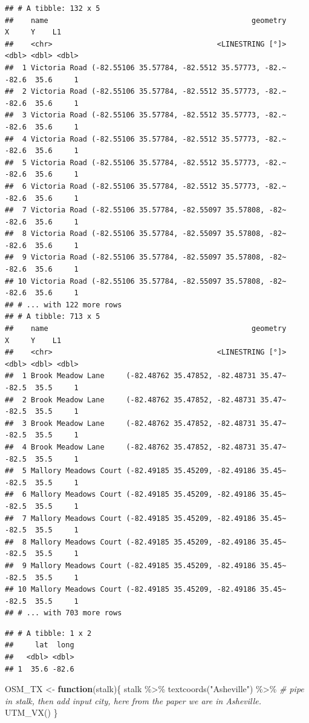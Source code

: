 \documentclass[
]{article}
\newenvironment{Shaded}{\begin{snugshade}}{\end{snugshade}}
\newcommand{\CommentTok}[1]{\textcolor[rgb]{0.56,0.35,0.01}{\textit{#1}}}
\newcommand{\ControlFlowTok}[1]{\textcolor[rgb]{0.13,0.29,0.53}{\textbf{#1}}}
\newcommand{\FunctionTok}[1]{\textcolor[rgb]{0.00,0.00,0.00}{#1}}
\newcommand{\NormalTok}[1]{#1}
\newcommand{\OtherTok}[1]{\textcolor[rgb]{0.56,0.35,0.01}{#1}}
\newcommand{\SpecialCharTok}[1]{\textcolor[rgb]{0.00,0.00,0.00}{#1}}
\newcommand{\StringTok}[1]{\textcolor[rgb]{0.31,0.60,0.02}{#1}}
\begin{document}
\begin{verbatim}
## # A tibble: 132 x 5
##    name                                               geometry     X     Y    L1
##    <chr>                                      <LINESTRING [°]> <dbl> <dbl> <dbl>
##  1 Victoria Road (-82.55106 35.57784, -82.5512 35.57773, -82.~ -82.6  35.6     1
##  2 Victoria Road (-82.55106 35.57784, -82.5512 35.57773, -82.~ -82.6  35.6     1
##  3 Victoria Road (-82.55106 35.57784, -82.5512 35.57773, -82.~ -82.6  35.6     1
##  4 Victoria Road (-82.55106 35.57784, -82.5512 35.57773, -82.~ -82.6  35.6     1
##  5 Victoria Road (-82.55106 35.57784, -82.5512 35.57773, -82.~ -82.6  35.6     1
##  6 Victoria Road (-82.55106 35.57784, -82.5512 35.57773, -82.~ -82.6  35.6     1
##  7 Victoria Road (-82.55106 35.57784, -82.55097 35.57808, -82~ -82.6  35.6     1
##  8 Victoria Road (-82.55106 35.57784, -82.55097 35.57808, -82~ -82.6  35.6     1
##  9 Victoria Road (-82.55106 35.57784, -82.55097 35.57808, -82~ -82.6  35.6     1
## 10 Victoria Road (-82.55106 35.57784, -82.55097 35.57808, -82~ -82.6  35.6     1
## # ... with 122 more rows
## # A tibble: 713 x 5
##    name                                               geometry     X     Y    L1
##    <chr>                                      <LINESTRING [°]> <dbl> <dbl> <dbl>
##  1 Brook Meadow Lane     (-82.48762 35.47852, -82.48731 35.47~ -82.5  35.5     1
##  2 Brook Meadow Lane     (-82.48762 35.47852, -82.48731 35.47~ -82.5  35.5     1
##  3 Brook Meadow Lane     (-82.48762 35.47852, -82.48731 35.47~ -82.5  35.5     1
##  4 Brook Meadow Lane     (-82.48762 35.47852, -82.48731 35.47~ -82.5  35.5     1
##  5 Mallory Meadows Court (-82.49185 35.45209, -82.49186 35.45~ -82.5  35.5     1
##  6 Mallory Meadows Court (-82.49185 35.45209, -82.49186 35.45~ -82.5  35.5     1
##  7 Mallory Meadows Court (-82.49185 35.45209, -82.49186 35.45~ -82.5  35.5     1
##  8 Mallory Meadows Court (-82.49185 35.45209, -82.49186 35.45~ -82.5  35.5     1
##  9 Mallory Meadows Court (-82.49185 35.45209, -82.49186 35.45~ -82.5  35.5     1
## 10 Mallory Meadows Court (-82.49185 35.45209, -82.49186 35.45~ -82.5  35.5     1
## # ... with 703 more rows
\end{verbatim}

\begin{verbatim}
## # A tibble: 1 x 2
##     lat  long
##   <dbl> <dbl>
## 1  35.6 -82.6
\end{verbatim}

\begin{Shaded}
\begin{Highlighting}[]
\NormalTok{OSM\_TX }\OtherTok{\textless{}{-}} \ControlFlowTok{function}\NormalTok{(stalk)\{}
\NormalTok{  stalk }\SpecialCharTok{\%\textgreater{}\%} 
    \FunctionTok{textcoords}\NormalTok{(}\StringTok{"Asheville"}\NormalTok{) }\SpecialCharTok{\%\textgreater{}\%} \CommentTok{\# pipe in stalk, then add input city, here from the paper we are in Asheville.}
    \FunctionTok{UTM\_VX}\NormalTok{()}
\NormalTok{\}}
\end{Highlighting}
\end{Shaded}
\end{document}
